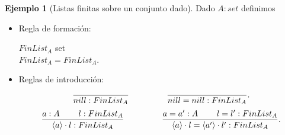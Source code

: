 \documentclass[11pt,oneside]{report}
\theoremstyle{plain}
\theoremstyle{definition}
\newtheorem{ejemplo}{Ejemplo}[chapter]
\begin{document}
\begin{ejemplo}[Listas finitas sobre un conjunto dado]
    Dado $A :set$ definimos
    \begin{itemize}
        \item Regla de formación:
        \begin{center}
            $FinList_A$ set\\
            $FinList_A=FinList_A$.
        \end{center}
        \item Reglas de introducción:
        $$\frac{}{nill:FinList_A} \hspace{16mm} \frac{}{nill=nill:FinList_A}.$$
        $$\frac{a:A\hspace{8mm}l:FinList_A}{\langle a\rangle\cdot l:FinList_A} \hspace{16mm} \frac{a=a':A\hspace{8mm}l=l':FinList_A}{\langle a\rangle\cdot l=\langle a'\rangle\cdot l':FinList_A}.$$
    \end{itemize}
\end{ejemplo}
\end{document}
